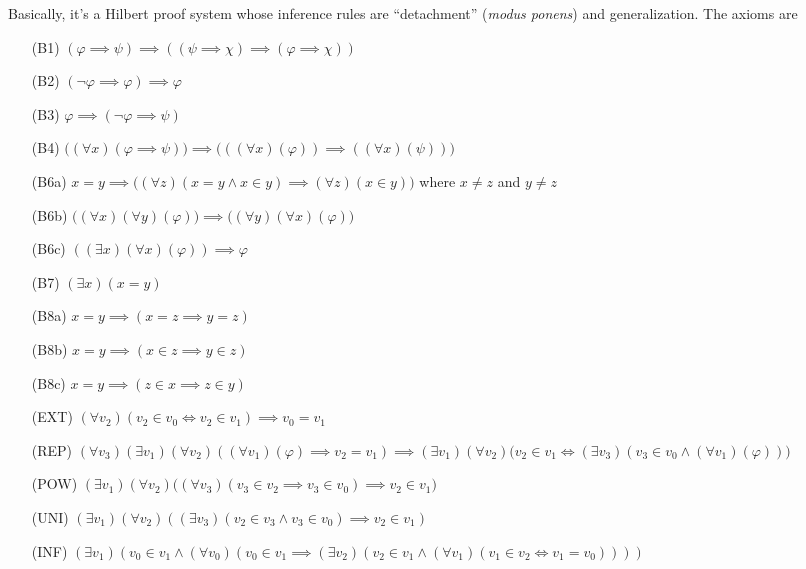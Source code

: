 \begin{node}
\begin{node}
\begin{node}[Axiomatization]\label{set:zfc-000J}%
Basically, it's a Hilbert proof system whose inference rules are
``detachment'' (\textit{modus ponens}) and generalization. The axioms
are
\begin{itemize}
\item[(B1)] $(\varphi\implies\psi)\implies((\psi\implies\chi)\implies(\varphi\implies\chi))$
\item[(B2)] $(\neg\varphi\implies\varphi)\implies\varphi$
\item[(B3)] $\varphi\implies(\neg\varphi\implies\psi)$
\item[(B4)] $\bigl((\forall x)(\varphi\implies\psi)\bigr)\implies\bigl(((\forall x)(\varphi))\implies((\forall x)(\psi))\bigr)$
\item[(B6a)] $x=y\implies\bigl((\forall z)(x=y\land x\in y)\implies(\forall z)(x\in y)\bigr)$
  where $x\neq z$ and $y\neq z$
\item[(B6b)] $\bigl((\forall x)(\forall y)(\varphi)\bigr)\implies\bigl((\forall y)(\forall x)(\varphi)\bigr)$
\item[(B6c)] $((\exists x)(\forall x)(\varphi))\implies\varphi$
\item[(B7)] $(\exists x)(x = y)$
\item[(B8a)] $x=y\implies(x=z\implies y=z)$
\item[(B8b)] $x=y\implies(x\in z\implies y\in z)$
\item[(B8c)] $x=y\implies(z\in x\implies z\in y)$
\item[(EXT)] $(\forall v_{2})(v_{2}\in v_{0}\iff v_{2}\in v_{1})\implies v_{0}=v_{1}$
\item[(REP)] $(\forall v_{3})(\exists v_{1})(\forall v_{2})((\forall v_{1})(\varphi)\implies v_{2}=v_{1})\implies(\exists v_{1})(\forall v_{2})\bigl(v_{2}\in v_{1}\iff(\exists v_{3})(v_{3}\in v_{0}\land(\forall v_{1})(\varphi))\bigr)$
\item[(POW)] $(\exists v_{1})(\forall v_{2})\bigl((\forall v_{3})(v_{3}\in v_{2}\implies v_{3}\in v_{0})\implies v_{2}\in v_{1}\bigr)$
\item[(UNI)] $(\exists v_{1})(\forall v_{2})((\exists v_{3})(v_{2}\in v_{3}\land v_{3}\in v_{0})\implies v_{2}\in v_{1})$
\item[(INF)] $(\exists v_{1})(v_{0}\in v_{1}\land(\forall v_{0})(v_{0}\in v_{1}\implies(\exists v_{2})(v_{2}\in v_{1}\land(\forall v_{1})(v_{1}\in v_{2}\iff v_{1}=v_{0}))))$
\end{itemize}
\end{node}


\end{node}
\end{node}
